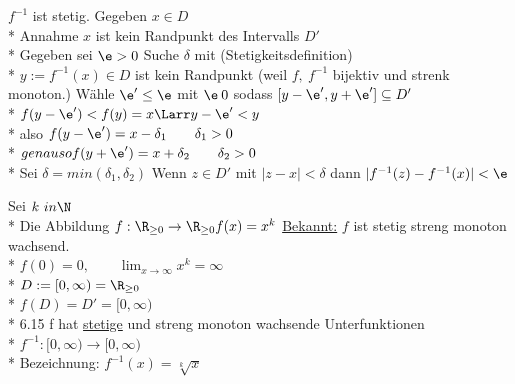 \beh
	$f^{-1}$ ist stetig. Gegeben $x \in D$\\*
	Annahme $x$ ist kein Randpunkt des Intervalls $D'$\\*
	Gegeben sei $\e > 0$ Suche $\delta$ mit (Stetigkeitsdefinition)\\*
	$y := f^{-1}(x) \in D$ ist kein Randpunkt (weil $f,\ f^{-1}$ bijektiv und strenk monoton.)
	Wähle $\e' \leq \e$ mit $\e \> 0$ sodass $[y-\e', y+\e'] \subseteq D'$\\*
	$f(y - \e') < f(y) = x \Larr y - \e' < y$\\*
	also $f(y - \e') = x - \delta_1 \qquad \delta_1 > 0$\\*
	$genauso f(y + \e') = x + \delta_2 \qquad \delta_2 > 0$ \\*
	Sei $\delta = min(\delta_1, \delta_2)$
\beh
	Wenn $z \in D'$ mit $|z - x| < \delta$ dann $|f^{-1}(z) - f^{-1}(x)| < \e$
	
	Sei $k \ in \N$\\*
	Die Abbildung $f: \R_{\geq 0} \to \R_{\geq 0} f(x) = x^k$
	\ul{Bekannt:} $f$ ist stetig streng monoton wachsend. \\*
	$f(0) = 0, \qquad \lim_{x \to \infty} x^k = \infty$\\*
	$D:= [0, \infty) = \R_{\geq 0}$\\*
	$f(D) = D' = [0, \infty)$\\*
	6.15 \Rarr f hat \ul{stetige} und streng monoton wachsende Unterfunktionen\\*
	$f^{-1} : [0, \infty) \to [0, \infty)$\\*
	Bezeichnung: $f^{-1}(x) = \sqrt[k]{x}$